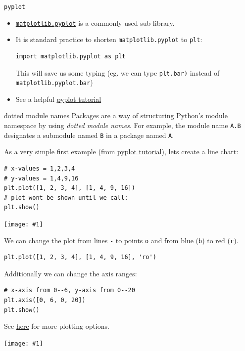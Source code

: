\documentclass[xcolor=svgnames]{beamer}
\newcommand{\nl}{\\[1em]}
\newcommand{\ipic}[2]{\texttt{[image: \#1]}}
\begin{document}
\begin{frame}[fragile]{\tt pyplot}
\begin{itemize}
\item \href{https://matplotlib.org/api/pyplot_api.html}{\tt matplotlib.pyplot} is a commonly used sub-library.\nl
\item It is  standard practice  to shorten {\tt matplotlib.pyplot} to {\tt plt}:
\begin{Verbatim}[frame=single]
import matplotlib.pyplot as plt
\end{Verbatim}
This will save us some typing (eg. we can type {\tt plt.bar)}  instead of {\tt matplotlib.pyplot.bar})\nl
\item See a helpful \href{https://matplotlib.org/3.1.0/tutorials/introductory/pyplot.html}{pyplot tutorial}
\end{itemize}
\begin{block}{dotted module names}
Packages are a way of structuring Python's module namespace by using \textit{dotted module names}. For example, the module name {\tt A.B} designates a submodule named {\tt B} in a package named {\tt A}.
\end{block}

\end{frame}

\begin{frame}[fragile]
As a very simple first example (from \href{https://matplotlib.org/3.1.0/tutorials/introductory/pyplot.html}{pyplot tutorial}), lets create a line chart:
\begin{Verbatim}[frame=single]
# x-values = 1,2,3,4
# y-values = 1,4,9,16
plt.plot([1, 2, 3, 4], [1, 4, 9, 16])
# plot wont be shown until we call:
plt.show()
\end{Verbatim}
\begin{center}
\ipic{img/plot1}{0.5}
\end{center}
\end{frame}

\begin{frame}[fragile]
We can change the plot from lines {\tt -} to points {\tt o} and from blue ({\tt b}) to red ({\tt r}).  
\begin{Verbatim}[frame=single]
plt.plot([1, 2, 3, 4], [1, 4, 9, 16], 'ro')
\end{Verbatim}

Additionally we can change the axis ranges:
\begin{Verbatim}[frame=single]
# x-axis from 0--6, y-axis from 0--20
plt.axis([0, 6, 0, 20])
plt.show()
\end{Verbatim}
See \href{https://matplotlib.org/3.1.0/api/_as_gen/matplotlib.pyplot.plot.html#matplotlib.pyplot.plot}{here} for more plotting options.
\begin{center}
\ipic{img/plot2}{0.5}
\end{center}

\end{frame}
\end{document}
